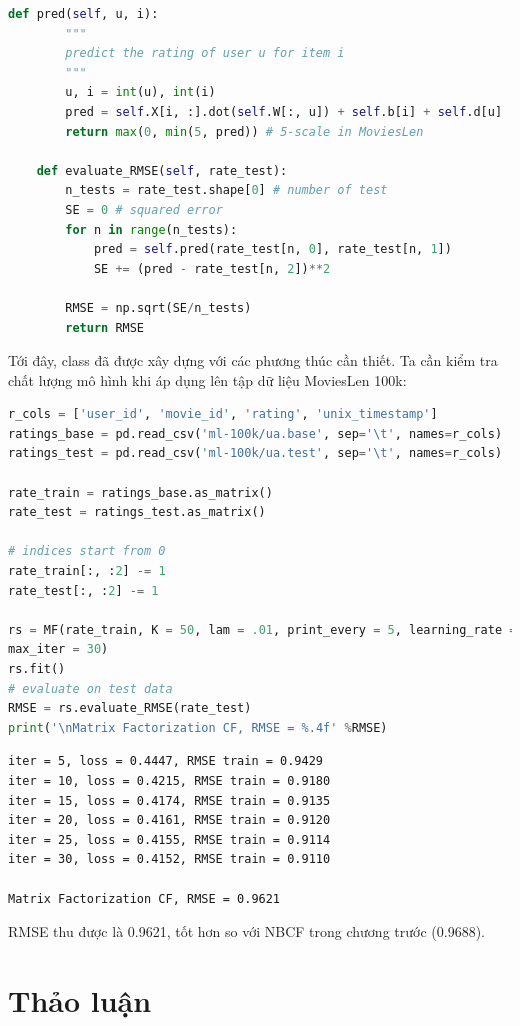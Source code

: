 \begin{lstlisting}[language=Python]
    def pred(self, u, i):
        """
        predict the rating of user u for item i
        """
        u, i = int(u), int(i)
        pred = self.X[i, :].dot(self.W[:, u]) + self.b[i] + self.d[u]
        return max(0, min(5, pred)) # 5-scale in MoviesLen

    def evaluate_RMSE(self, rate_test):
        n_tests = rate_test.shape[0] # number of test
        SE = 0 # squared error
        for n in range(n_tests):
            pred = self.pred(rate_test[n, 0], rate_test[n, 1])
            SE += (pred - rate_test[n, 2])**2

        RMSE = np.sqrt(SE/n_tests)
        return RMSE
\end{lstlisting}

Tới đây, class  đã được xây dựng với các phương thúc
cần thiết. Ta cần kiểm tra chất lượng mô hình khi áp dụng
lên tập dữ liệu MoviesLen 100k:
\begin{lstlisting}[language=Python]
r_cols = ['user_id', 'movie_id', 'rating', 'unix_timestamp']
ratings_base = pd.read_csv('ml-100k/ua.base', sep='\t', names=r_cols)
ratings_test = pd.read_csv('ml-100k/ua.test', sep='\t', names=r_cols)

rate_train = ratings_base.as_matrix()
rate_test = ratings_test.as_matrix()

# indices start from 0
rate_train[:, :2] -= 1
rate_test[:, :2] -= 1

rs = MF(rate_train, K = 50, lam = .01, print_every = 5, learning_rate = 50,
max_iter = 30)
rs.fit()
# evaluate on test data
RMSE = rs.evaluate_RMSE(rate_test)
print('\nMatrix Factorization CF, RMSE = %.4f' %RMSE)
\end{lstlisting}
\kq
\begin{lstlisting}
iter = 5, loss = 0.4447, RMSE train = 0.9429
iter = 10, loss = 0.4215, RMSE train = 0.9180
iter = 15, loss = 0.4174, RMSE train = 0.9135
iter = 20, loss = 0.4161, RMSE train = 0.9120
iter = 25, loss = 0.4155, RMSE train = 0.9114
iter = 30, loss = 0.4152, RMSE train = 0.9110

Matrix Factorization CF, RMSE = 0.9621
\end{lstlisting}

RMSE thu được là 0.9621, tốt hơn so với NBCF trong chương trước (0.9688).

\section{Thảo luận}
\label{sec:25_4}

